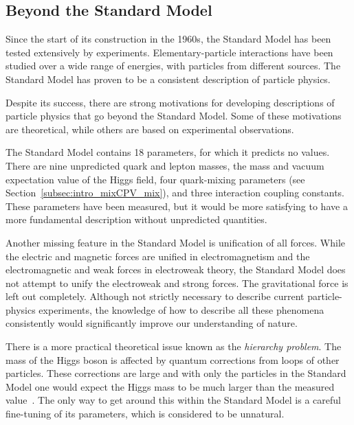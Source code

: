 \subsection{Beyond the Standard Model}
\label{subsec:intro_SM_beyond}

Since the start of its construction in the 1960s, the Standard Model has been tested extensively by experiments. Elementary-particle
interactions have been studied over a wide range of energies, with particles from different sources. The Standard Model has proven to be
a consistent description of particle physics.

Despite its success, there are strong motivations for developing descriptions of particle physics that go beyond the Standard Model. Some
of these motivations are theoretical, while others are based on experimental observations.

The Standard Model contains 18 parameters, for which it predicts no values. There are nine unpredicted quark and lepton masses, the mass
and vacuum expectation value of the Higgs field, four quark-mixing parameters (see Section~\ref{subsec:intro_mixCPV_mix}), and three
interaction coupling constants. These parameters have been measured, but it would be more satisfying to have a more fundamental description
without unpredicted quantities.

Another missing feature in the Standard Model is unification of all forces. While the electric and magnetic forces are unified in
electromagnetism and the electromagnetic and weak forces in electroweak theory, the Standard Model does not attempt to unify the
electroweak and strong forces. The gravitational force is left out completely. Although not strictly necessary to describe current
particle-physics experiments, the knowledge of how to describe all these phenomena consistently would significantly improve our
understanding of nature.

There is a more practical theoretical issue known as the \emph{hierarchy problem}. The mass of the Higgs boson is affected by quantum
corrections from loops of other particles. These corrections are large and with only the particles in the Standard Model one would expect
the Higgs mass to be much larger than the measured value~\cite{Weinberg:1975gm,*Susskind:1978ms,*'tHooft:1979bj}. The only way to get
around this within the Standard Model is a careful fine-tuning of its parameters, which is considered to be unnatural.

